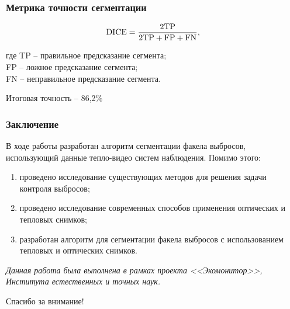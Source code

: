 \documentclass[t]{beamer}
\begin{document}
	\begin{frame}
		\frametitle{Метрика точности сегментации}
		\vspace{0.5cm}
		\begin{equation}
			\textup{DICE} = \frac{2\textup{TP}}{2\textup{TP} + \textup{FP} + \textup{FN}},
			\label{eq:DiceLoss}		\vspace{0.3cm}
		\end{equation}

		где TP -- правильное предсказание сегмента;\\ \hfill \break
		\hspace*{0.65cm}FP -- ложное предсказание сегмента;\\ \hfill \break
		\hspace*{0.65cm}FN -- неправильное предсказание сегмента.\\ \hfill \break
		
		Итоговая точность -- 86,2\%
	\end{frame}

	\begin{frame}
		\frametitle{Заключение}
		В ходе работы разработан алгоритм сегментации факела выбросов, использующий данные тепло-видео систем наблюдения. Помимо этого:
		\begin{enumerate}
			\justifying
			\item проведено исследование существующих методов для решения задачи контроля выбросов;
			\item проведено исследование современных способов применения оптических и тепловых снимков;
			\item разработан алгоритм для сегментации факела выбросов с использованием тепловых и оптических снимков.
		\end{enumerate}
		
		
		\textit{Данная работа была выполнена в рамках проекта <<Экомонитор>>, Института естественных и точных наук.}
	\end{frame}

	\begin{frame}
		\vspace{2.9cm}
		\begin{center}{\Huge{Спасибо за внимание!}}\end{center}
	\end{frame}

\appendix
%
\end{document}
